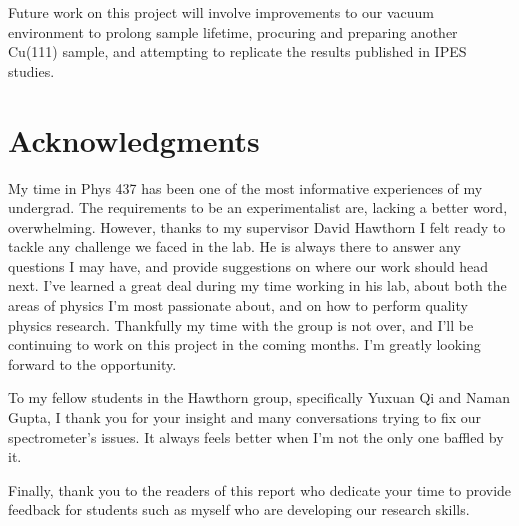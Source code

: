 Future work on this project will involve improvements to our vacuum environment to prolong sample lifetime, procuring and preparing another Cu(111) sample, and attempting to replicate the results published in IPES studies.

\clearpage

\section{Acknowledgments}

My time in Phys 437 has been one of the most informative experiences of my undergrad. The requirements to be an experimentalist are, lacking a better word,
overwhelming. However, thanks to my supervisor David Hawthorn I felt ready to tackle any challenge we faced in the lab. He is always there to answer
any questions I may have, and provide suggestions on where our work should head next. I've learned a great deal during my time working in his lab, 
about both the areas of physics I'm most passionate about, and on how to perform quality physics research. Thankfully my time with the group is not 
over, and I'll be continuing to work on this project in the coming months. I'm greatly looking forward to the opportunity.

To my fellow students in the Hawthorn group, specifically Yuxuan Qi and Naman Gupta, I thank you for your insight and many conversations trying to fix 
our spectrometer's issues. It always feels better when I'm not the only one baffled by it. 

Finally, thank you to the readers of this report who dedicate your time to provide feedback for students such as myself who are developing our research skills.
